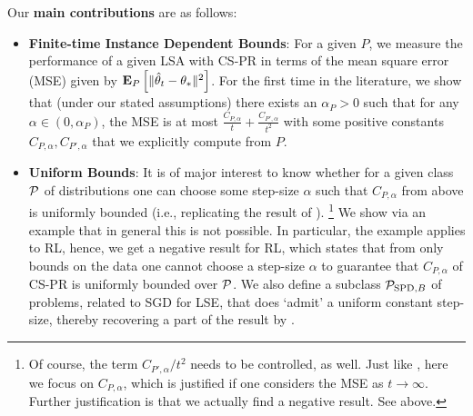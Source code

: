 Our \textbf{main contributions} are as follows:
\begin{itemize}[leftmargin=*]%
\item \textbf{Finite-time Instance Dependent Bounds}: For a given $P$, we  measure the performance of a given LSA with CS-PR in terms of the mean square error (MSE) given by $\EEP{\normsm{\thh_t-\ts}^2}$. 
For the first time in the literature,
we show that (under our stated assumptions) there exists an $\alpha_P>0$ such that 
for any $\alpha\in (0,\alpha_P)$,
the MSE %
is at most $\frac{C_{P,\alpha}}{t}+\frac{C_{P',\alpha}}{t^2}$ with some positive constants $C_{P,\alpha},C_{P',\alpha}$ that we explicitly compute from $P$.
\item \textbf{Uniform Bounds}:
It is of major interest to know whether for a given class $\P$ of distributions 
one can choose some step-size $\alpha$ 
such that $C_{P,\alpha}$ from above is uniformly bounded (i.e., replicating the result of \citet{bach}).%
\footnote{Of course, the term $C_{P',\alpha}/t^2$ needs to be controlled, as well. Just like \citet{bach}, here we focus on $C_{P,\alpha}$, which is justified if one considers the MSE as $t\to\infty$. Further justification is that we actually find a negative result. See above.}
We show via an example that in general this is not possible.
In particular, the example applies to RL, hence, we get a negative result for RL, which states that from only bounds on the data one cannot choose a step-size $\alpha$ to guarantee that $C_{P,\alpha}$ of CS-PR is uniformly bounded over $\P$.
We also define a subclass  $\P_{\text{SPD},B}$ of problems, related to SGD for LSE, that does `admit' a uniform constant step-size, thereby recovering a part of the result by \citet{bach}.

\end{itemize}

